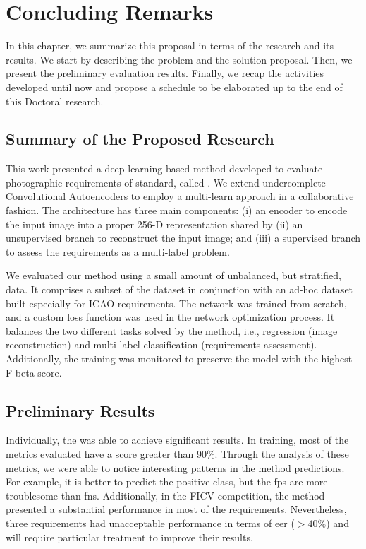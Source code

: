 \section{Concluding Remarks}

In this chapter, we summarize this proposal in terms of the research and its results. We start by describing the problem and the solution proposal. Then, we present the preliminary evaluation results. Finally, we recap the activities developed until now and propose a schedule to be elaborated up to the end of this Doctoral research.

\subsection{Summary of the Proposed Research}

This work presented a deep learning-based method developed to evaluate photographic requirements of \icao standard, called \methodname. We extend undercomplete Convolutional Autoencoders to employ a multi-learn approach in a collaborative fashion. The architecture has three main components: (i) an encoder to encode the input image into a proper 256-D representation shared by (ii) an unsupervised branch to reconstruct the input image; and (iii) a supervised branch to assess the requirements as a multi-label problem. 

We evaluated our method using a small amount of unbalanced, but stratified, data. It comprises a subset of the \ficvtest dataset in conjunction with an ad-hoc dataset built especially for ICAO requirements. The network was trained from scratch, and a custom loss function was used in the network optimization process. It balances the two different tasks solved by the method, i.e., regression (image reconstruction) and multi-label classification (requirements assessment). Additionally, the training was monitored to preserve the model with the highest F-beta score.

\subsection{Preliminary Results}

Individually, the \methodname was able to achieve significant results. In training, most of the metrics evaluated have a score greater than 90\%. Through the analysis of these metrics, we were able to notice interesting patterns in the method predictions. For example, it is better to predict the positive class, but the \aclp{fp} are more troublesome than \aclp{fn}. Additionally, in the FICV competition, the method presented a substantial performance in most of the requirements. Nevertheless, three requirements had unacceptable performance in terms of \acs{eer} ($> 40\%$) and will require particular treatment to improve their results.


